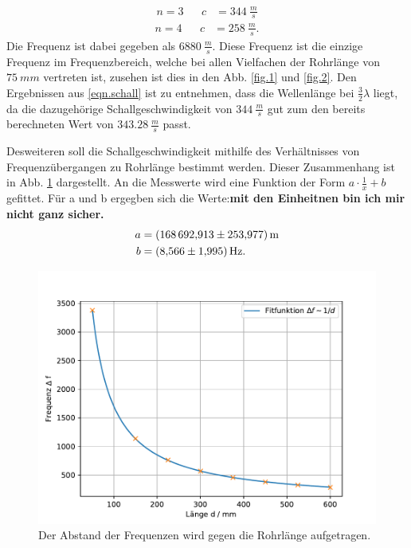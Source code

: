 \begin{align}
  n=3&&  c&=\SI{344}{\frac{m}{s}}
  \label{eqn.schall}
\end{align}
\begin{align*}
  n=4&&  c&=\SI{258}{\frac{m}{s}}.
\end{align*}
Die Frequenz ist dabei gegeben als $\SI{6880}{\frac{m}{s}}$.
Diese Frequenz ist die einzige Frequenz im Frequenzbereich, welche bei allen Vielfachen der Rohrlänge von $\SI{75}{mm}$ vertreten ist,
zusehen ist dies in den Abb. \ref{fig.1} und \ref{fig.2}.
Den Ergebnissen aus \ref{eqn.schall} ist zu entnehmen, dass die Wellenlänge bei $\frac{3}{2}\lambda$ liegt, da die dazugehörige Schallgeschwindigkeit von $\SI{344}{\frac{m}{s}}$ gut zum den bereits berechneten Wert von $\SI{343.28}{\frac{m}{s}}$ passt.

\FloatBarrier
Desweiteren soll die Schallgeschwindigkeit mithilfe des Verhältnisses von Frequenzübergangen zu Rohrlänge bestimmt werden.
Dieser Zusammenhang ist in Abb. \ref{fig.1/x} dargestellt.
An die Messwerte wird eine Funktion der Form $a\cdot\frac{1}{x}+b$ gefittet.
Für a und b ergegben sich die Werte:\textbf{\huge{mit den Einheitnen bin ich mir nicht ganz sicher.}}
\begin{align*}
  a&=\SI{168692.913\pm253.977}{m}\\
  b&=\SI{8.566\pm1.995}{Hz}.\\
\end{align*}
\begin{figure}[h!]
  \centering
  \includegraphics[width=\textwidth]{geschi.pdf}
  \caption{Der Abstand der Frequenzen wird gegen die Rohrlänge aufgetragen.}
  \label{fig.1/x}
\end{figure}
\FloatBarrier

